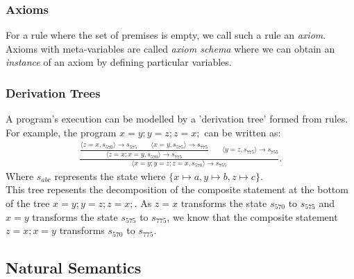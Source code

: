 \subsubsection{Axioms}

For a rule where the set of premises is empty, we call 
such a rule an \textit{axiom}. Axioms with meta-variables
are called \textit{axiom schema} where we can obtain an
\textit{instance} of an axiom by defining particular
variables.

\subsubsection{Derivation Trees}

A program's execution can be modelled by a 'derivation tree'
formed from rules.
For example, the program $x=y;y=z;z=x;$ can be written as:
\begin{gather*}
  \frac{\dfrac{
    \langle z=x, s_{570} \rangle \to s_{575} 
    \qquad \langle x=y, s_{575} \rangle \to s_{775}
  }{\langle z=x;x=y, s_{570} \rangle \to s_{775}}
  \qquad \langle y=z, s_{775} \rangle \to s_{755}}
  {\langle x=y;y=z;z=x, s_{570} \rangle \to s_{755}}.
\end{gather*} Where $s_{abc}$ represents the state where 
$\{x \mapsto a, y \mapsto b, z \mapsto c\}$.
\\[\baselineskip]
This tree repesents the decomposition of the composite statement
at the bottom of the tree $x=y;y=z;z=x;$. As $z=x$ transforms
the state $s_{570}$ to $s_{575}$ and $x=y$ transforms the state
$s_{575}$ to $s_{775}$, we know that the composite statement
$z=x;x=y$ transforms $s_{570}$ to $s_{775}$.

\subsection{Natural Semantics}

